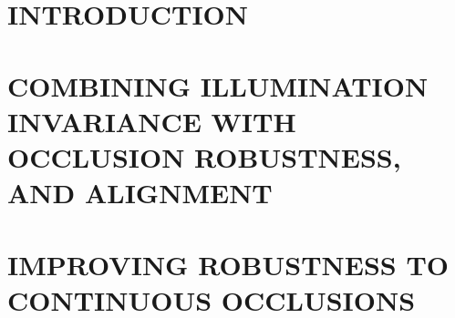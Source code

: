 \documentclass[draftthesis,tocnosub,noragright,centerchapter,12pt]{uiucecethesis09}
\begin{document}


%

\mainmatter

%

\chapter{INTRODUCTION}
\label{chap:introduction}
%

\chapter{COMBINING ILLUMINATION INVARIANCE WITH OCCLUSION ROBUSTNESS, AND ALIGNMENT}
\label{chap:cvpr}


\chapter{IMPROVING ROBUSTNESS TO CONTINUOUS OCCLUSIONS}
\label{chap:iccv}
%

%
%
%

%
\appendix 


\backmatter

%


\end{document}
